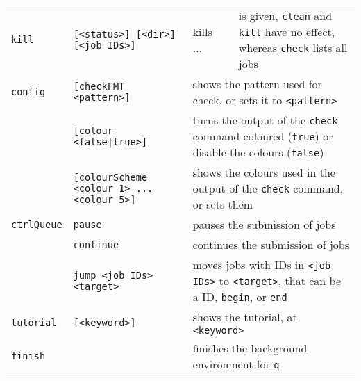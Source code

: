 \documentclass[a4paper,11pt]{article}
\newcommand{\qpy}{{\texttt{q}\raisebox{-0.45ex}{\textit{py}}}}
\begin{document}
\begin{landscape}
\begin{minipage}{1.0\textheight}
\begin{tabular}{lllll}
      \cellcolor{RC1}\texttt{kill} & \cellcolor{RC1}\texttt{[<status>] [<dir>] [<job IDs>]}
                                   & \cellcolor{RC1}kills ... &
                                   & \cellcolor{RC1}is given, \texttt{clean} and \texttt{kill} have no effect, whereas \texttt{check} lists all jobs\\
      \texttt{config}    & \texttt{[checkFMT <pattern>]}
                                   & \multicolumn{3}{l}{shows the pattern used for check, or sets it to \texttt{<pattern>}} \\
                         & \texttt{[colour <false|true>]}
                                   & \multicolumn{3}{l}{turns the output of the \texttt{check} command coloured (\texttt{true}) or disable the colours (\texttt{false})} \\
                         & \texttt{[colourScheme <colour 1> ... <colour 5>]}
                                   & \multicolumn{3}{l}{shows the colours used in the output of the \texttt{check} command, or sets them} \\
      \rowcolor{RC1}
      \texttt{ctrlQueue} & \texttt{pause}
                                   & \multicolumn{3}{l}{pauses the submission of jobs} \\
      \rowcolor{RC1}
                         & \texttt{continue}
                                   & \multicolumn{3}{l}{continues the submission of jobs} \\
      \rowcolor{RC1}
                         & \texttt{jump <job IDs> <target>}
                                   & \multicolumn{3}{l}{moves jobs with IDs in \texttt{<job IDs>} to \texttt{<target>}, that can be a ID, \texttt{begin}, or \texttt{end}} \\
      \texttt{tutorial}  & \texttt{[<keyword>]}
                                   & \multicolumn{3}{l}{shows the tutorial, at \texttt{<keyword>}} \\
      \rowcolor{RC1}
      \texttt{finish}    &
                                   & \multicolumn{3}{l}{finishes the background environment for \qpy{}} \\
      \hline
    \end{tabular}
  \end{minipage}\vspace{0.2cm}


\end{landscape}
\end{document}
